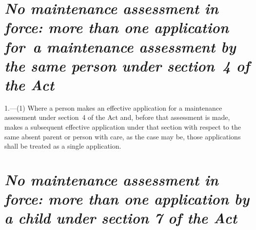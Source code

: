 \documentclass[a4paper,12pt]{article}
\begin{document}
\renewcommand\parthead{--- Schedule 2}

\section*{\itshape No maintenance assessment in force: more than one application for~a maintenance assessment by the same person under section~4 
of the Act}

1.—(1) Where a person makes an effective application for a maintenance assessment under section~4 
of the Act and, before that assessment is made, makes a subsequent effective application under that section with respect to the same absent parent or person with care, as the case may be, those applications shall be treated as a single application.

%
%


\section*{\itshape No maintenance assessment in force: more than one application by a child under section 7 of the Act}
\end{document}
